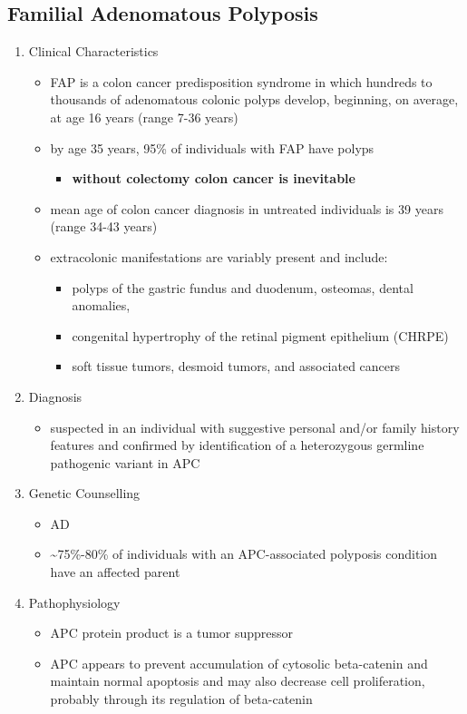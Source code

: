 \documentclass[12pt]{scrartcl}
\begin{document}
\subsection{Familial Adenomatous Polyposis}
\label{sec:orge390649}
\begin{enumerate}
\item Clinical Characteristics
\label{sec:orgc8605be}
\begin{itemize}
\item FAP is a colon cancer predisposition syndrome in which hundreds to
thousands of adenomatous colonic polyps develop, beginning, on
average, at age 16 years (range 7-36 years)
\item by age 35 years, 95\% of individuals with FAP have polyps
\begin{itemize}
\item \textbf{without colectomy colon cancer is inevitable}
\end{itemize}
\item mean age of colon cancer diagnosis in untreated individuals is
39 years (range 34-43 years)
\item extracolonic manifestations are variably present and include:
\begin{itemize}
\item polyps of the gastric fundus and duodenum, osteomas, dental anomalies,
\item congenital hypertrophy of the retinal pigment epithelium (CHRPE)
\item soft tissue tumors, desmoid tumors, and associated cancers
\end{itemize}
\end{itemize}

\item Diagnosis
\label{sec:org9a5c823}
\begin{itemize}
\item suspected in an individual with suggestive personal and/or family
history features and confirmed by identification of a heterozygous
germline pathogenic variant in APC
\end{itemize}

\item Genetic Counselling
\label{sec:orgefaf33e}
\begin{itemize}
\item AD
\item \textasciitilde{}75\%-80\% of individuals with an APC-associated polyposis condition
have an affected parent
\end{itemize}
\item Pathophysiology
\label{sec:org1c381dd}
\begin{itemize}
\item APC protein product is a tumor suppressor
\item APC appears to prevent accumulation of cytosolic beta-catenin and
maintain normal apoptosis and may also decrease cell proliferation,
probably through its regulation of beta-catenin
\end{itemize}
\end{enumerate}
\end{document}
